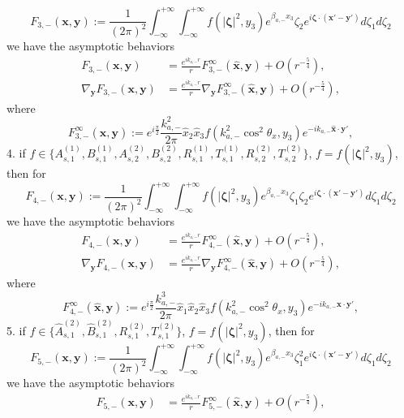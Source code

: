 \documentclass[final,reqno]{siamltex}
\begin{document}
\begin{theorem}
	$$
	F_{3,-}(\mathbf{x},\mathbf{y}):=\frac{1}{(2\pi)^2}\int_{-\infty}^{+\infty}\int_{-\infty}^{+\infty}f(|\boldsymbol{\zeta}|^2,y_3)e^{\beta_{a,-}x_3}\zeta_2e^{i\boldsymbol{\zeta}\cdot(\mathbf{x}'-\mathbf{y}')}d\zeta_1d\zeta_2
	$$
	we have the asymptotic behaviors 
	\begin{align*}
	F_{3,-}(\mathbf{x},\mathbf{y})&=\frac{e^{ik_{a,-}r}}{r}F_{3,-}^\infty(\hat{\mathbf{x}},\mathbf{y})+O(r^{-\frac{5}{4}}), \\ 
	\nabla_{\mathbf{y}}F_{3,-}(\mathbf{x},\mathbf{y})&=\frac{e^{ik_{a,-}r}}{r}\nabla_{\mathbf{y}}F_{3,-}^\infty(\hat{\mathbf{x}},\mathbf{y})+O(r^{-\frac{5}{4}}), 
	\end{align*}
	where 
	$$
	F_{3,-}^\infty(\hat{\mathbf{x}},\mathbf{y}):=e^{i\frac{\pi}{2}}\frac{k_{a,-}^2}{2\pi}\hat x_2\hat x_3f(k_{a,-}^2\cos^2\theta_x,y_3)e^{-ik_{a,-}\hat{\mathbf{x}}\cdot\mathbf{y}'}, 
	$$
	4. if $f\in\{A_{s,1}^{(1)},B_{s,1}^{(1)},A_{s,2}^{(2)},B_{s,2}^{(2)},R_{s,1}^{(1)},T_{s,1}^{(1)},R_{s,2}^{(2)},T_{s,2}^{(2)}\}$, $f=f(|\boldsymbol{\zeta}|^2,y_3)$,  then for 
	$$
	F_{4,-}(\mathbf{x},\mathbf{y}):=\frac{1}{(2\pi)^2}\int_{-\infty}^{+\infty}\int_{-\infty}^{+\infty}f(|\boldsymbol{\zeta}|^2,y_3)e^{\beta_{a,-}x_3}\zeta_1\zeta_2e^{i\boldsymbol{\zeta}\cdot(\mathbf{x}'-\mathbf{y}')}d\zeta_1d\zeta_2
	$$
	we have the asymptotic behaviors 
	\begin{align*}
	F_{4,-}(\mathbf{x},\mathbf{y})&=\frac{e^{ik_{a,-}r}}{r}F_{4,-}^\infty(\hat{\mathbf{x}},\mathbf{y})+O(r^{-\frac{5}{4}}), \\ 
	\nabla_{\mathbf{y}}F_{4,-}(\mathbf{x},\mathbf{y})&=\frac{e^{ik_{a,-}r}}{r}\nabla_{\mathbf{y}}F_{4,-}^\infty(\hat{\mathbf{x}},\mathbf{y})+O(r^{-\frac{5}{4}}), 
	\end{align*}
	where 
	$$
	F_{4,-}^\infty(\hat{\mathbf{x}},\mathbf{y}):=e^{i\frac{\pi}{2}}\frac{k_{a,-}^3}{2\pi}\hat x_1\hat x_2\hat x_3f(k_{a,-}^2\cos^2\theta_x,y_3)e^{-ik_{a,-}\hat{\mathbf{x}}\cdot\mathbf{y}'}, 
	$$
	5. if $f\in\{\hat A_{s,1}^{(2)},\hat B_{s,1}^{(2)},R_{s,1}^{(2)},T_{s,1}^{(2)}\}$, $f=f(|\boldsymbol{\zeta}|^2,y_3)$,  then for 
	$$
	F_{5,-}(\mathbf{x},\mathbf{y}):=\frac{1}{(2\pi)^2}\int_{-\infty}^{+\infty}\int_{-\infty}^{+\infty}f(|\boldsymbol{\zeta}|^2,y_3)e^{\beta_{a,-}x_3}\zeta_1^2e^{i\boldsymbol{\zeta}\cdot(\mathbf{x}'-\mathbf{y}')}d\zeta_1d\zeta_2
	$$
	we have the asymptotic behaviors 
	\begin{align*}
	F_{5,-}(\mathbf{x},\mathbf{y})&=\frac{e^{ik_{a,-}r}}{r}F_{5,-}^\infty(\hat{\mathbf{x}},\mathbf{y})+O(r^{-\frac{5}{4}}), \\ 

\end{align*}
\end{theorem}
\end{document}
